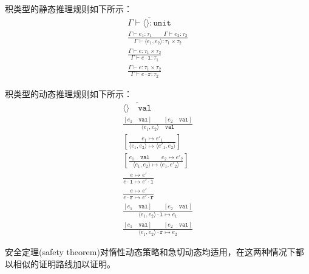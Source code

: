 
积类型的静态推理规则如下所示：
\label{static-rules}\begin{subequations}
    \begin{gather}
    \overline{\Gamma \vdash \langle \rangle : \mathtt{unit}} \\
    \frac{\Gamma \vdash e_1: \tau_1 \qquad \Gamma \vdash e_2 : \tau_2}
         {\Gamma \vdash \langle e_1,e_2 \rangle : \tau_1 \times \tau_2} \\
    \frac{\Gamma \vdash e : \tau_1 \times \tau_2}
         {\Gamma \vdash e \cdot \mathtt{l} : \tau_1} \\
    \frac{\Gamma \vdash e : \tau_1 \times \tau_2}
         {\Gamma \vdash e \cdot \mathtt{r} : \tau_2}
    \end{gather}
\end{subequations}

积类型的动态推理规则如下所示：
\label{dynamic-rules}\begin{subequations}
    \begin{gather}
    \overline{\langle \rangle \quad \mathtt{val}} \\
    \frac{[e_1 \quad \mathtt{val}] \qquad [e_2 \quad \mathtt{val}]}
    {\langle e_1, e_2 \rangle \quad \mathtt{val}} \\
    \left[\frac{e_1 \longmapsto e'_{1} }
    {\langle e_1, e_2 \rangle \longmapsto \langle e'_{1}, e_2 \rangle}
    \right] \\
    \left[\frac{e_1 \quad \mathtt{val} \qquad e_2 \longmapsto e'_{2} }
    {\langle e_1, e_2 \rangle \longmapsto \langle e_{1}, e'_2 \rangle}
    \right] \\
    \frac{e \longmapsto e'}{e \cdot \mathtt{l} \longmapsto e' \cdot \mathtt{l}} \\
    \frac{e \longmapsto e'}{e \cdot \mathtt{r} \longmapsto e' \cdot \mathtt{r}} \\
    \frac{[e_1 \quad \mathtt{val}] \qquad [e_2 \quad \mathtt{val}]}
    {\langle e_1, e_2 \rangle \cdot \mathtt{l} \longmapsto e_1} \\
    \frac{[e_1 \quad \mathtt{val}] \qquad [e_2 \quad \mathtt{val}]}
    {\langle e_1, e_2 \rangle \cdot \mathtt{r} \longmapsto e_2}
    \end{gather}
\end{subequations}


安全定理(safety theorem)对惰性动态策略和急切动态均适用，在这两种情况下都以相似的证明路线加以证明。

